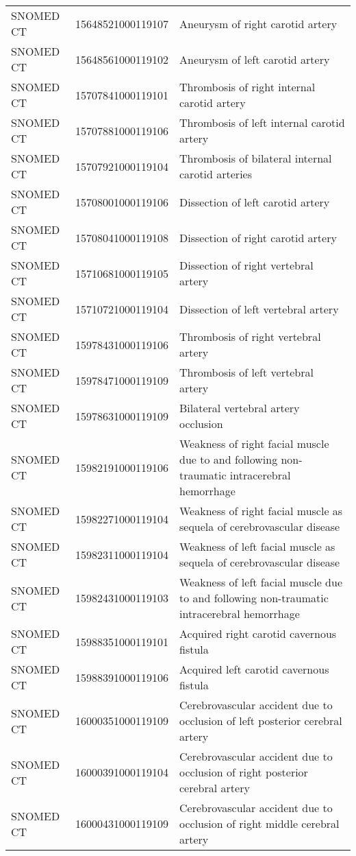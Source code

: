 \begin{longtable}{p{}p{}p{}}
  SNOMED CT & 15648521000119107 & Aneurysm of right carotid artery \\ 
  SNOMED CT & 15648561000119102 & Aneurysm of left carotid artery \\ 
  SNOMED CT & 15707841000119101 & Thrombosis of right internal carotid artery \\ 
  SNOMED CT & 15707881000119106 & Thrombosis of left internal carotid artery \\ 
  SNOMED CT & 15707921000119104 & Thrombosis of bilateral internal carotid arteries \\ 
  SNOMED CT & 15708001000119106 & Dissection of left carotid artery \\ 
  SNOMED CT & 15708041000119108 & Dissection of right carotid artery \\ 
  SNOMED CT & 15710681000119105 & Dissection of right vertebral artery \\ 
  SNOMED CT & 15710721000119104 & Dissection of left vertebral artery \\ 
  SNOMED CT & 15978431000119106 & Thrombosis of right vertebral artery \\ 
  SNOMED CT & 15978471000119109 & Thrombosis of left vertebral artery \\ 
  SNOMED CT & 15978631000119109 & Bilateral vertebral artery occlusion \\ 
  SNOMED CT & 15982191000119106 & Weakness of right facial muscle due to and following non-traumatic intracerebral hemorrhage \\ 
  SNOMED CT & 15982271000119104 & Weakness of right facial muscle as sequela of cerebrovascular disease \\ 
  SNOMED CT & 15982311000119104 & Weakness of left facial muscle as sequela of cerebrovascular disease \\ 
  SNOMED CT & 15982431000119103 & Weakness of left facial muscle due to and following non-traumatic intracerebral hemorrhage \\ 
  SNOMED CT & 15988351000119101 & Acquired right carotid cavernous fistula \\ 
  SNOMED CT & 15988391000119106 & Acquired left carotid cavernous fistula \\ 
  SNOMED CT & 16000351000119109 & Cerebrovascular accident due to occlusion of left posterior cerebral artery \\ 
  SNOMED CT & 16000391000119104 & Cerebrovascular accident due to occlusion of right posterior cerebral artery \\ 
  SNOMED CT & 16000431000119109 & Cerebrovascular accident due to occlusion of right middle cerebral artery \\ 

\end{longtable}
